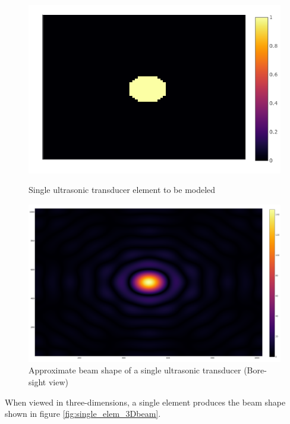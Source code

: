 \begin{figure}[h!]
\centering

    \begin{minipage}{0.4\textwidth}
    \centering
    \includegraphics[width= \textwidth]{Figures/arraySim/single/element1.png}
    \caption{Single ultrasonic transducer element to be modeled}
    \label{fig:single_elem}
    \end{minipage}\hfill
    \begin{minipage}{0.4\textwidth}
    \centering
    \includegraphics[width= \textwidth]{Figures/arraySim/single/beampat_top.png}
    \caption{Approximate beam shape of a single ultrasonic transducer (Bore-sight view)}
    \label{fig:single_elem_topBeam}
    \end{minipage}
    
\end{figure}
When viewed in three-dimensions, a single element produces the beam shape shown in figure \ref{fig:single_elem_3Dbeam}.
